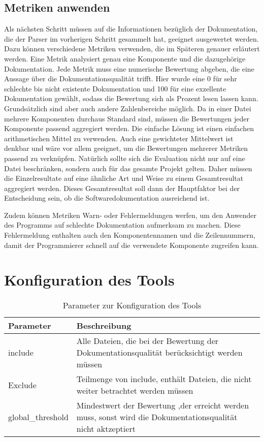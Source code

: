 \subsection{Metriken anwenden}
Als nächsten Schritt müssen auf die Informationen bezüglich der Dokumentation, die der Parser im vorherigen Schritt gesammelt hat, geeignet ausgewertet werden. Dazu können verschiedene Metriken verwenden, die im Späteren genauer erläutert werden. Eine Metrik analysiert genau eine Komponente und die dazugehörige Dokumentation. Jede Metrik muss eine numerische Bewertung  abgeben, die eine Aussage über die Dokumentationsqualität trifft. Hier wurde eine 0 für sehr schlechte bis nicht existente Dokumentation und 100 für eine exzellente Dokumentation gewählt, sodass die Bewertung sich als Prozent lesen lassen kann. Grundsätzlich sind aber auch andere Zahlenbereiche möglich.
Da in einer Datei mehrere Komponenten durchaus Standard sind, müssen die Bewertungen jeder Komponente passend aggregiert werden. Die einfache Lösung ist einen einfachen arithmetischen Mittel zu verwenden. Auch eine gewichteter Mittelwert ist denkbar und wäre vor allem geeignet, um die Bewertungen mehrerer Metriken passend zu verknüpfen. Natürlich sollte sich die Evaluation nicht nur auf eine Datei beschränken, sondern auch für das gesamte Projekt gelten. Daher müssen die Einzelresultate auf eine ähnliche Art und Weise zu einem Gesamtresultat aggregiert werden. Dieses Gesamtresultat soll dann der Hauptfaktor bei der Entscheidung sein, ob die Softwaredokumentation ausreichend ist. 

Zudem können Metriken Warn- oder Fehlermeldungen werfen, um den Anwender des Programms auf schlechte Dokumentation aufmerksam zu machen. Diese Fehlermeldung enthalten auch den Komponentennamen und die Zeilennummern, damit der Programmierer schnell auf die verwendete Komponente zugreifen kann. 
\section{Konfiguration des Tools}
\begin{table}[h]
    \centering
    \begin{tabular}{m{4cm}|m{11cm}}
    \hline
        Parameter & Beschreibung  \\
        \hline
        include & Alle Dateien, die bei der Bewertung der Dokumentationsqualität berücksichtigt werden müssen\\
        \hline
        Exclude & Teilmenge von include, enthält Dateien, die nicht weiter betrachtet werden müssen\\
        \hline
        global\_threshold & Mindestwert der Bewertung ,der erreicht werden muss, sonst wird die Dokumentationsqualität nicht aktzeptiert
    \end{tabular}
    \caption{Parameter zur Konfiguration des Tools}
    \label{tab:tool_javadoc_conf}
\end{table}
